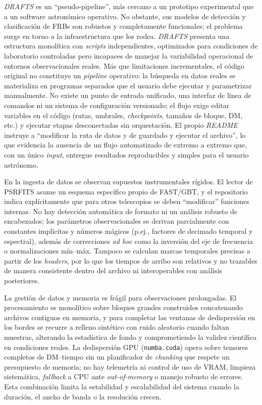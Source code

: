\textit{DRAFTS} es un “pseudo-pipeline”, más cercano a un prototipo experimental que a un software astronómico operativo. No obstante, sus modelos de detección y clasificación de FRBs son robustos y completamente funcionales; el problema surge en torno a la infraestructura que los rodea. \textit{DRAFTS} presenta una estructura monolítica con \textit{scripts} independientes, optimizados para condiciones de laboratorio controladas pero incapaces de manejar la variabilidad operacional de entornos observacionales reales. Más que limitaciones incrementales, el código original no constituye un \textit{pipeline} operativo: la búsqueda en datos reales se materializa en programas separados que el usuario debe ejecutar y parametrizar manualmente. No existe un punto de entrada unificado, una interfaz de línea de comandos ni un sistema de configuración versionado; el flujo exige editar variables en el código (rutas, umbrales, \textit{checkpoints}, tamaños de bloque, DM, etc.) y ejecutar etapas desconectadas sin orquestación. El propio \textit{README} instruye a “modificar la ruta de datos y de guardado y ejecutar el archivo”, lo que evidencia la ausencia de un flujo automatizado de extremo a extremo que, con un único \textit{input}, entregue resultados reproducibles y simples para el usuario astrónomo.

En la ingesta de datos se observan supuestos instrumentales rígidos. El lector de PSRFITS asume un esquema específico propio de FAST/GBT, y el repositorio indica explícitamente que para otros telescopios se deben “modificar” funciones internas. No hay detección automática de formato ni un análisis robusto de encabezados; los parámetros observacionales se derivan parcialmente con constantes implícitas y números mágicos (p.ej., factores de decimado temporal y espectral), además de correcciones \textit{ad hoc} como la inversión del eje de frecuencia o normalizaciones mín–máx. Tampoco se calculan marcas temporales precisas a partir de los \textit{headers}, por lo que los tiempos de arribo son relativos y no trazables de manera consistente dentro del archivo ni interoperables con análisis posteriores.

La gestión de datos y memoria es frágil para observaciones prolongadas. El procesamiento es monolítico sobre bloques grandes construidos concatenando archivos contiguos en memoria, y para completar las ventanas de dedispersión en los bordes se recurre a relleno sintético con ruido aleatorio cuando faltan muestras, alterando la estadística de fondo y comprometiendo la validez científica en condiciones reales. La dedispersión GPU (\texttt{numba.cuda}) opera sobre tensores completos de DM–tiempo sin un planificador de \textit{chunking} que respete un presupuesto de memoria; no hay telemetría ni control de uso de VRAM, limpieza sistemática, \textit{fallback} a CPU ante \textit{out-of-memory} o manejo robusto de errores. Esta combinación limita la estabilidad y escalabilidad del sistema cuando la duración, el ancho de banda o la resolución crecen.

